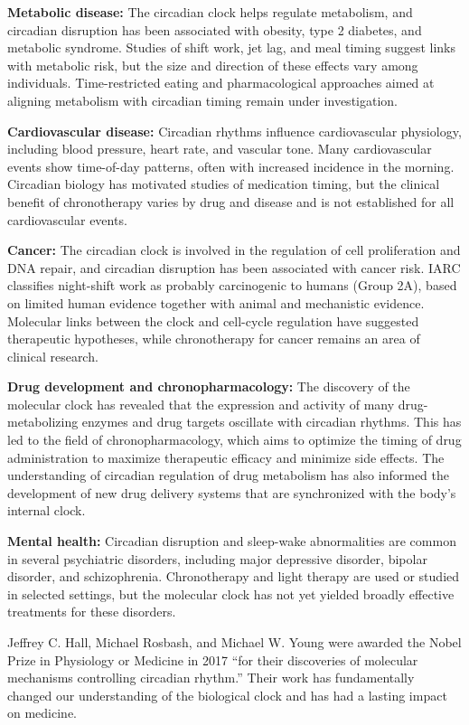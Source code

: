 \textbf{Metabolic disease:} The circadian clock helps regulate metabolism, and circadian disruption has been associated with obesity, type 2 diabetes, and metabolic syndrome. Studies of shift work, jet lag, and meal timing suggest links with metabolic risk, but the size and direction of these effects vary among individuals. Time-restricted eating and pharmacological approaches aimed at aligning metabolism with circadian timing remain under investigation.

\textbf{Cardiovascular disease:} Circadian rhythms influence cardiovascular physiology, including blood pressure, heart rate, and vascular tone. Many cardiovascular events show time-of-day patterns, often with increased incidence in the morning. Circadian biology has motivated studies of medication timing, but the clinical benefit of chronotherapy varies by drug and disease and is not established for all cardiovascular events.

\textbf{Cancer:} The circadian clock is involved in the regulation of cell proliferation and DNA repair, and circadian disruption has been associated with cancer risk. IARC classifies night-shift work as probably carcinogenic to humans (Group 2A), based on limited human evidence together with animal and mechanistic evidence. Molecular links between the clock and cell-cycle regulation have suggested therapeutic hypotheses, while chronotherapy for cancer remains an area of clinical research.

\textbf{Drug development and chronopharmacology:} The discovery of the molecular clock has revealed that the expression and activity of many drug-metabolizing enzymes and drug targets oscillate with circadian rhythms. This has led to the field of chronopharmacology, which aims to optimize the timing of drug administration to maximize therapeutic efficacy and minimize side effects. The understanding of circadian regulation of drug metabolism has also informed the development of new drug delivery systems that are synchronized with the body's internal clock.

\textbf{Mental health:} Circadian disruption and sleep-wake abnormalities are common in several psychiatric disorders, including major depressive disorder, bipolar disorder, and schizophrenia. Chronotherapy and light therapy are used or studied in selected settings, but the molecular clock has not yet yielded broadly effective treatments for these disorders.

Jeffrey C. Hall, Michael Rosbash, and Michael W. Young were awarded the Nobel Prize in Physiology or Medicine in 2017 ``for their discoveries of molecular mechanisms controlling circadian rhythm.'' Their work has fundamentally changed our understanding of the biological clock and has had a lasting impact on medicine.

